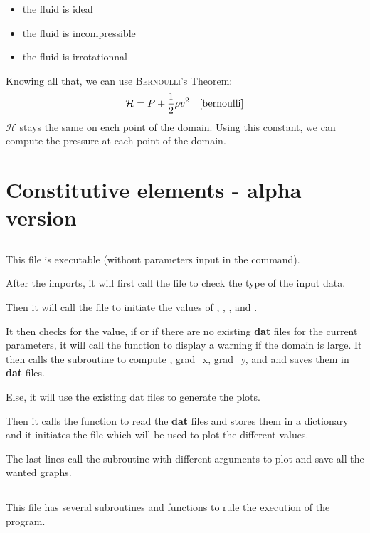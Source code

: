 \begin{itemize}[noitemsep]
      \item the fluid is ideal
      \item the fluid is incompressible
      \item the fluid is irrotationnal
\end{itemize}
Knowing all that, we can use \textsc{Bernoulli}'s Theorem:
\[
      \mathcal{H} = P + \dfrac{1}{2} \rho v^2 \quad \text{\cite{bernoulli}}
\]
$\mathcal{H}$ stays the same on each point of the domain. Using this constant,
we can compute the pressure at each point of the domain.

\section{Constitutive elements - alpha version}
\subsection{}
This file is executable (without parameters input in the command).

After the imports, it will first call the file  to check the
type of the input data.

Then it will call the file  to initiate
the values of , , ,  and .

It then checks for the  value, if  or if there are no
existing \textbf{dat} files for the current parameters, it will call
the function  to display a warning if the domain is large.
It then calls the subroutine  to compute ,
grad\_x, grad\_y,  and  and saves them in
\textbf{dat} files.

Else, it will use the existing dat files to generate the plots.

Then it calls the function  to read the \textbf{dat} files and
stores them in a dictionary and it initiates the file  which will be
used to plot the different values.

The last lines call the subroutine  with different arguments
to plot and save all the wanted graphs.

\subsection{}
This file has several subroutines and functions to rule the execution of the
program.

